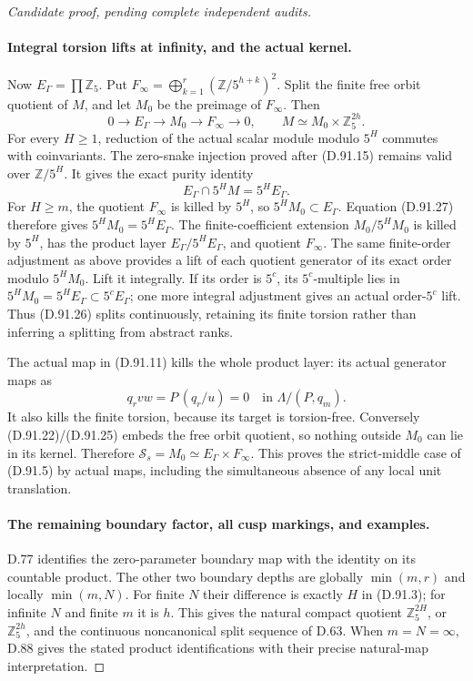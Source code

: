 \begin{proof}[Candidate proof, pending complete independent audits]
\paragraph{Integral torsion lifts at infinity, and the actual kernel.}
Now \(E_\Gamma=\prod\mathbb Z_5\). Put
\(F_\infty=\bigoplus_{k=1}^r(\mathbb Z/5^{h+k})^2\).
Split the finite free orbit quotient of \(M\), and let
\(M_0\) be the preimage of \(F_\infty\). Then
\[
 0\longrightarrow E_\Gamma\longrightarrow M_0
              \longrightarrow F_\infty\longrightarrow0,
 \qquad M\simeq M_0\times\mathbb Z_5^{2h}.
                                                               \tag{D.91.26}
\]
For every \(H\ge1\), reduction of the actual scalar
module modulo \(5^H\) commutes with coinvariants. The
zero-snake injection proved after (D.91.15) remains valid
over \(\mathbb Z/5^H\). It gives the exact purity identity
\[
             E_\Gamma\cap5^H M=5^H E_\Gamma.
                                                               \tag{D.91.27}
\]
For \(H\ge m\), the quotient \(F_\infty\) is killed
by \(5^H\), so \(5^HM_0\subset E_\Gamma\). Equation
(D.91.27) therefore gives \(5^HM_0=5^HE_\Gamma\).
The finite-coefficient extension
\(M_0/5^HM_0\) is killed by \(5^H\), has the product
layer \(E_\Gamma/5^HE_\Gamma\), and quotient
\(F_\infty\). The same finite-order adjustment as above
provides a lift of each quotient generator of its exact
order modulo \(5^HM_0\). Lift it integrally. If its
order is \(5^c\), its \(5^c\)-multiple lies in
\(5^HM_0=5^HE_\Gamma\subset5^cE_\Gamma\); one more
integral adjustment gives an actual order-\(5^c\) lift.
Thus (D.91.26) splits continuously, retaining its finite
torsion rather than inferring a splitting from abstract ranks.

The actual map in (D.91.11) kills the whole product layer:
its actual generator maps as
\[
                      q_rvw=P\,(q_r/u)=0
                          \quad\text{in }\Lambda/(P,q_m).
                                                               \tag{D.91.28}
\]
It also kills the finite torsion, because its target is
torsion-free. Conversely (D.91.22)/(D.91.25) embeds the
free orbit quotient, so nothing outside \(M_0\) can
lie in its kernel. Therefore
\(\mathcal S_s=M_0\simeq E_\Gamma\times F_\infty\).
This proves the strict-middle case of (D.91.5) by actual
maps, including the simultaneous absence of any local
unit translation.

\paragraph{The remaining boundary factor, all cusp markings, and examples.}
D.77 identifies the zero-parameter boundary map with the
identity on its countable product. The other two boundary
depths are globally \(\min(m,r)\) and locally
\(\min(m,N)\). For finite \(N\) their difference is
exactly \(H\) in (D.91.3); for infinite \(N\) and
finite \(m\) it is \(h\). This gives the natural compact
quotient \(\mathbb Z_5^{2H}\), or \(\mathbb Z_5^{2h}\),
and the continuous noncanonical split sequence of D.63.
When \(m=N=\infty\), D.88 gives the stated product
identifications with their precise natural-map interpretation.


\end{proof}
